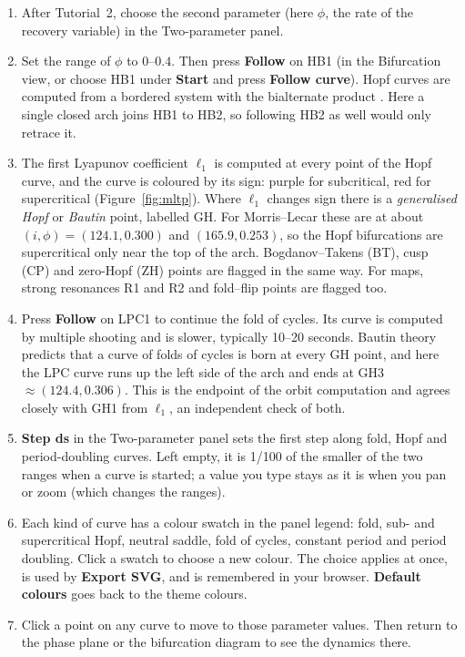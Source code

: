 \documentclass[11pt,a4paper]{article}
\newcommand{\ui}[1]{\textsf{\textbf{#1}}}          %
\begin{document}
\begin{tryit}
\begin{enumerate}
  \item After Tutorial~2, choose the second parameter (here $\phi$, the rate of the recovery variable) in the Two-parameter panel.
  \item Set the range of $\phi$ to $0$--$0.4$. Then press \ui{Follow} on HB1 (in the Bifurcation view, or choose HB1 under \ui{Start} and press \ui{Follow curve}). Hopf curves are computed from a bordered system with the bialternate product \cite{govaerts2000,kuznetsov2004}. Here a single closed arch joins HB1 to HB2, so following HB2 as well would only retrace it.
  \item The first Lyapunov coefficient $\ell_1$ is computed at every point of the Hopf curve, and the curve is coloured by its sign: purple for subcritical, red for supercritical (Figure~\ref{fig:mltp}). Where $\ell_1$ changes sign there is a \emph{generalised Hopf} or \emph{Bautin} point, labelled GH. For Morris--Lecar these are at about $(i,\phi)=(124.1,0.300)$ and $(165.9,0.253)$, so the Hopf bifurcations are supercritical only near the top of the arch. Bogdanov--Takens (BT), cusp (CP) and zero-Hopf (ZH) points are flagged in the same way. For maps, strong resonances R1 and R2 and fold--flip points are flagged too.
  \item Press \ui{Follow} on LPC1 to continue the fold of cycles. Its curve is computed by multiple shooting and is slower, typically 10--20 seconds. Bautin theory predicts that a curve of folds of cycles is born at every GH point, and here the LPC curve runs up the left side of the arch and ends at GH3 $\approx(124.4,0.306)$. This is the endpoint of the orbit computation and agrees closely with GH1 from $\ell_1$, an independent check of both.
  \item \ui{Step ds} in the Two-parameter panel sets the first step along fold, Hopf and period-doubling curves. Left empty, it is 1/100 of the smaller of the two ranges when a curve is started; a value you type stays as it is when you pan or zoom (which changes the ranges).
  \item Each kind of curve has a colour swatch in the panel legend: fold, sub- and supercritical Hopf, neutral saddle, fold of cycles, constant period and period doubling. Click a swatch to choose a new colour. The choice applies at once, is used by \ui{Export SVG}, and is remembered in your browser. \ui{Default colours} goes back to the theme colours.
  \item Click a point on any curve to move to those parameter values. Then return to the phase plane or the bifurcation diagram to see the dynamics there.

\end{enumerate}
\end{tryit}
\end{document}
